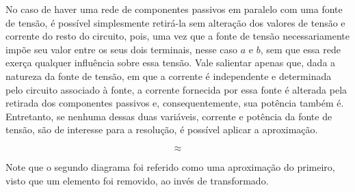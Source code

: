 \documentclass{article}
\numberwithin{equation}{section}
\newlength\Colsep
\begin{document}
\noindent No caso de haver uma rede de componentes passivos em paralelo com uma fonte de tensão, é possível simplesmente retirá-la sem alteração dos valores de tensão e corrente do resto do circuito, pois, uma vez que a fonte de tensão necessariamente impõe seu valor entre os seus dois terminais, nesse caso $a$ e $b$, sem que essa rede exerça qualquer influência sobre essa tensão. Vale salientar apenas que, dada a natureza da fonte de tensão, em que a corrente é independente e determinada pelo circuito associado à fonte, a corrente fornecida por essa fonte é alterada pela retirada dos componentes passivos e, consequentemente, sua potência também é. Entretanto, se nenhuma dessas duas variáveis, corrente e potência da fonte de tensão, são de interesse para a resolução, é possível aplicar a aproximação.

\noindent\begin{minipage}{\textwidth}
\begin{minipage}[c][4cm][c]{\dimexpr0.45\textwidth-0.5\Colsep\relax}
    \begin{center}
    \end{center}
\end{minipage} \hfill
\begin{minipage}[c][4cm][c]{\dimexpr0.1\textwidth-0.5\Colsep\relax}
    $$\approx$$
\end{minipage} \hfill
\begin{minipage}[c][4cm][c]{\dimexpr0.45\textwidth-0.5\Colsep\relax}
    \begin{center}
    \end{center}
\end{minipage}
\end{minipage}

Note que o segundo diagrama foi referido como uma aproximação do primeiro, visto que um elemento foi removido, ao invés de transformado.
\end{document}
